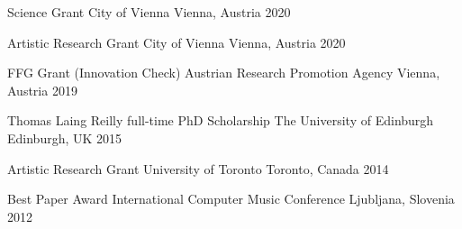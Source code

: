 
\begin{cvhonors}

  \cvhonor
    {Science Grant} %
    {City of Vienna} %
    {Vienna, Austria} %
    {2020} %

  \cvhonor
    {Artistic Research Grant} %
    {City of Vienna} %
    {Vienna, Austria} %
    {2020} %

  \cvhonor
    {FFG Grant (Innovation Check)} %
    {Austrian Research Promotion Agency} %
    {Vienna, Austria} %
    {2019} %

  \cvhonor
    {Thomas Laing Reilly full-time PhD Scholarship} %
    {The University of Edinburgh} %
    {Edinburgh, UK} %
    {2015} %

  \cvhonor
    {Artistic Research Grant} %
    {University of Toronto} %
    {Toronto, Canada} %
    {2014} %

  \cvhonor
    {Best Paper Award} %
    {International Computer Music Conference} %
    {Ljubljana, Slovenia} %
    {2012} %

\end{cvhonors}

